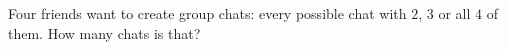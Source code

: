 Four friends want to create group chats: every possible chat with $2$, $3$ or all $4$ of them. How many chats is that?
